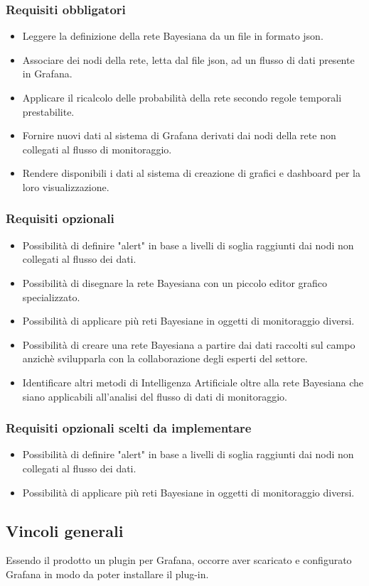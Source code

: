 				\subsubsection{Requisiti obbligatori}
				\begin{itemize}
					\item Leggere la definizione della rete Bayesiana da un file in formato json.
					\item Associare dei nodi della rete, letta dal file json, ad un flusso di dati presente in Grafana.
					\item Applicare il ricalcolo delle probabilità della rete secondo regole temporali prestabilite.
					\item Fornire nuovi dati al sistema di Grafana derivati dai nodi della rete non collegati al flusso di monitoraggio.
					\item Rendere disponibili i dati al sistema di creazione di grafici e dashboard per la loro visualizzazione.
		        \end{itemize}
				\subsubsection{Requisiti opzionali}
				\begin{itemize}
					\item Possibilità di definire "alert\pedice" in base a livelli di soglia raggiunti dai nodi non collegati al flusso dei dati.
					\item Possibilità di disegnare la rete Bayesiana con un piccolo editor grafico specializzato.
					\item Possibilità di applicare più reti Bayesiane in oggetti di monitoraggio diversi.
					\item Possibilità di creare una rete Bayesiana a partire dai dati raccolti sul campo anzichè svilupparla con la collaborazione degli esperti del settore.
					\item Identificare altri metodi di Intelligenza Artificiale oltre alla rete Bayesiana che siano applicabili all'analisi del flusso di dati di monitoraggio.
		        \end{itemize}
		        \subsubsection{Requisiti opzionali scelti da implementare}
				\begin{itemize}
					\item Possibilità di definire "alert" in base a livelli di soglia raggiunti dai nodi non collegati al flusso dei dati.
					\item Possibilità di applicare più reti Bayesiane in oggetti di monitoraggio diversi.
		        	\end{itemize}
				
				
		\subsection{Vincoli generali}			
Essendo il prodotto un plugin per Grafana, occorre aver scaricato e configurato Grafana in modo da poter installare il plug-in.


\newpage
